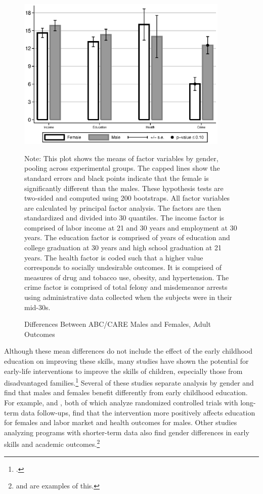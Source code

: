 \begin{figure}[H]
\begin{center}
\caption{Differences Between ABC/CARE Males and Females, Adult Outcomes}
\label{fig:intro-adult-outcomes}
	\includegraphics[width=0.9\textwidth]{../output/abccare-gdiff-adult}
\end{center}
\raggedright \scriptsize
Note: This plot shows the means of factor variables by gender, pooling across experimental groups. The capped lines show the standard errors and black points indicate that the female is significantly different than the males. These hypothesis tests are two-sided and computed using 200 bootstraps. All factor variables are calculated by principal factor analysis. The factors are then standardized and divided into 30 quantiles. The income factor is comprised of labor income at 21 and 30 years and employment at 30 years. The education factor is comprised of years of education and college graduation at 30 years and high school graduation at 21 years. The health factor is coded such that a higher value corresponds to socially undesirable outcomes. It is comprised of measures of drug and tobacco use, obesity, and hypertension. The crime factor is comprised of total felony and misdemeanor arrests using administrative data collected when the subjects were in their mid-30s.
\end{figure}

Although these mean differences do not include the effect of the early childhood education on improving these skills, many studies have shown the potential for early-life interventions to improve the skills of children, especially those from disadvantaged families.\footnote{\citet{Elango_Hojman_etal_2016_Early-Edu}.} Several of these studies separate analysis by gender and find that males and females benefit differently from early childhood education. For example, \citet{Heckman_Moon_etal_2010_QE} and \citet{Garcia_etal_2016_Comp_CBA_Unpublished}, both of which analyze randomized controlled trials with long-term data follow-ups, find that the intervention more positively affects education for females and labor market and health outcomes for males. Other studies analyzing programs with shorter-term data also find gender differences in early skills and academic outcomes.\footnote{\citet{Deming_2009_AEJAE} and \citet{Ou_Reynolds_2010_Mechanisms_CYSR} are examples of this.} 

